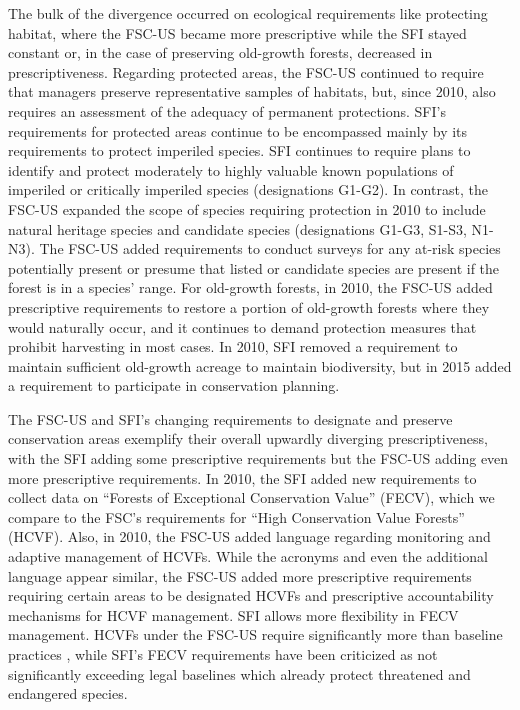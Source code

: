\documentclass[
      12pt,
            Review ]{article}
\begin{document}
The bulk of the divergence occurred on ecological requirements like
protecting habitat, where the FSC-US became more prescriptive while the
SFI stayed constant or, in the case of preserving old-growth forests,
decreased in prescriptiveness. Regarding protected areas, the FSC-US
continued to require that managers preserve representative samples of
habitats, but, since 2010, also requires an assessment of the adequacy
of permanent protections. SFI's requirements for protected areas
continue to be encompassed mainly by its requirements to protect
imperiled species. SFI continues to require plans to identify and
protect moderately to highly valuable known populations of imperiled or
critically imperiled species (designations G1-G2). In contrast, the
FSC-US expanded the scope of species requiring protection in 2010 to
include natural heritage species and candidate species (designations
G1-G3, S1-S3, N1-N3). The FSC-US added requirements to conduct surveys
for any at-risk species potentially present or presume that listed or
candidate species are present if the forest is in a species' range. For
old-growth forests, in 2010, the FSC-US added prescriptive requirements
to restore a portion of old-growth forests where they would naturally
occur, and it continues to demand protection measures that prohibit
harvesting in most cases. In 2010, SFI removed a requirement to maintain
sufficient old-growth acreage to maintain biodiversity, but in 2015
added a requirement to participate in conservation planning.

The FSC-US and SFI's changing requirements to designate and preserve
conservation areas exemplify their overall upwardly diverging
prescriptiveness, with the SFI adding some prescriptive requirements but
the FSC-US adding even more prescriptive requirements. In 2010, the SFI
added new requirements to collect data on ``Forests of Exceptional
Conservation Value'' (FECV), which we compare to the FSC's requirements
for ``High Conservation Value Forests'' (HCVF). Also, in 2010, the
FSC-US added language regarding monitoring and adaptive management of
HCVFs. While the acronyms and even the additional language appear
similar, the FSC-US added more prescriptive requirements requiring
certain areas to be designated HCVFs and prescriptive accountability
mechanisms for HCVF management. SFI allows more flexibility in FECV
management. HCVFs under the FSC-US require significantly more than
baseline practices \citep{Newsom2005}, while SFI's FECV requirements
have been criticized as not significantly exceeding legal baselines
which already protect threatened and endangered species.
\end{document}
